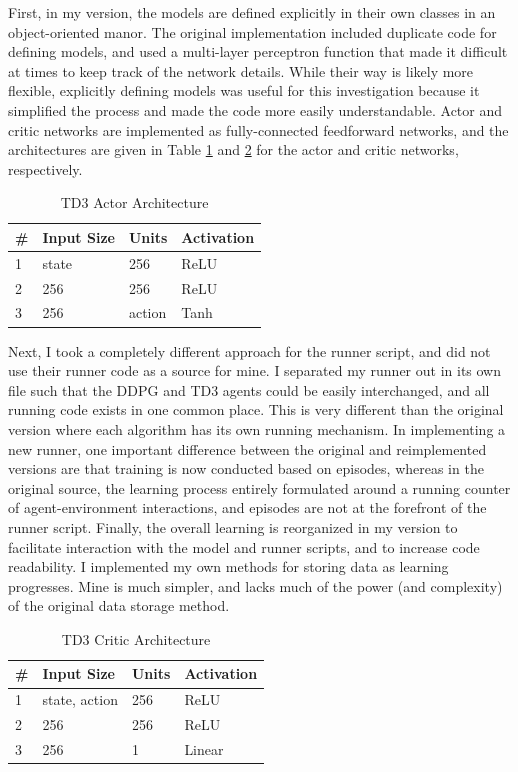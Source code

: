 \documentclass{article}
\begin{document}
First, in my version, the models are defined explicitly in their own classes in an object-oriented manor. The original implementation included duplicate code for defining models, and used a multi-layer perceptron function that made it difficult at times to keep track of the network details. While their way is likely more flexible, explicitly defining models was useful for this investigation because it simplified the process and made the code more easily understandable. Actor and critic networks are implemented as fully-connected feedforward networks, and the architectures are given in Table \ref{tab:actor} and \ref{tab:critic} for the actor and critic networks, respectively.

\begin{table}[!h]
\centering
\caption{TD3 Actor Architecture}
\begin{tabular}{|p{0.5cm}|p{}|p{1.5cm}|p{1.5cm}|}
\hline
\# & Input Size & Units & Activation \\
\hline
1 & state & 256 & ReLU\\
2 & 256 & 256 & ReLU\\
3 & 256 & action & Tanh\\
\hline
\end{tabular}
\label{tab:actor}
\end{table}
Next, I took a completely different approach for the runner script, and did not use their runner code as a source for mine. I separated my runner out in its own file such that the DDPG and TD3 agents could be easily interchanged, and all running code exists in one common place. This is very different than the original version where each algorithm has its own running mechanism. In implementing a new runner, one important difference between the original and reimplemented versions are that training is now conducted based on episodes, whereas in the original source, the learning process entirely formulated around a running counter of agent-environment interactions, and episodes are not at the forefront of the runner script. Finally, the overall learning is reorganized in my version to facilitate interaction with the model and runner scripts, and to increase code readability. I implemented my own methods for storing data as learning progresses. Mine is much simpler, and lacks much of the power (and complexity) of the original data storage method.

\begin{table}[!h]
\centering
\caption{TD3 Critic Architecture}
\begin{tabular}{|p{0.5cm}|p{}|p{1.5cm}|p{1.5cm}|}
\hline
\# & Input Size & Units & Activation \\
\hline
1 & state, action & 256 & ReLU\\
2 & 256 & 256 & ReLU\\
3 & 256 & 1 & Linear\\
\hline
\end{tabular}
\label{tab:critic}
\end{table}
\end{document}
